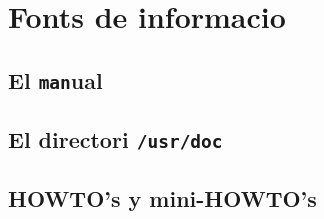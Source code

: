 \section{Fonts de informacio}

\subsection{El \texttt{man}ual}

\subsection{El directori \texttt{/usr/doc}}

\subsection{HOWTO's y mini-HOWTO's}

